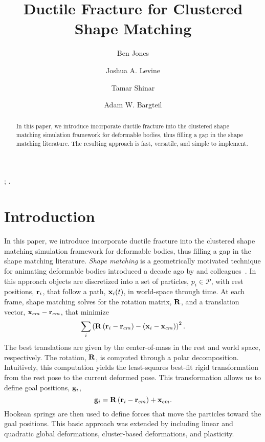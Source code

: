 \documentclass[review]{acmsiggraph}
\title{Ductile Fracture for Clustered Shape Matching}
\author[*]{Ben Jones}
\author[**]{Joshua A. Levine}
\author[***]{Tamar Shinar}
\author[*]{Adam W. Bargteil}
\affil[*]{University of Utah}
\affil[**]{Clemson University}
\affil[***]{University of California, Riverside}
\begin{document}

 \teaser{
   \caption{}
 }

\maketitle

\begin{abstract}
In this paper, we introduce incorporate ductile fracture into the clustered shape matching simulation framework
for deformable bodies, thus filling a gap in the shape matching literature.  The resulting approach is fast,
versatile, and simple to implement.
\end{abstract}

\begin{CRcatlist}
  ;
  .
\end{CRcatlist}

\keywordlist


\copyrightspace

\section{Introduction}\label{sec:Introduction}
In this paper, we introduce incorporate ductile fracture into the clustered shape matching simulation framework
for deformable bodies, thus filling a gap in the shape matching literature. 
{\em Shape matching} is a geometrically motivated technique for animating deformable bodies introduced
a decade ago by \Mueller and colleagues~.
In this approach
objects are discretized into a set of particles, $p_i\in\mathcal{P}$, with rest positions, $\mathit{\mathbf{r}}_i$, 
that follow a path, $\mathit{\mathbf{x}}_i(t)$, in world-space through time.  
At each frame, shape matching solves for the rotation matrix, $\mathit{\mathbf{R}}$, and a translation
vector, $\mathit{\mathbf{x}}_{cm}-\mathit{\mathbf{r}}_{cm}$, that minimize
\begin{equation}
\sum_i \left(\mathit{\mathbf{R}}\left(\mathit{\mathbf{r}}_i - \mathit{\mathbf{r}}_{cm}\right)-\left(\mathit{\mathbf{x}}_i-\mathit{\mathbf{x}}_{cm}\right)\right)^2.
\end{equation}
The best translations are given by the center-of-mass in the rest and world space, respectively.  
The rotation, $\mathit{\mathbf{R}}$, is computed through a polar decomposition.  Intuitively, this computation
yields the least-squares best-fit rigid transformation from the rest pose to the current deformed pose.
This transformation allows us to define goal positions, $\mathit{\mathbf{g}}_i$,
\begin{equation}
\mathit{\mathbf{g}}_i = \mathit{\mathbf{R}}\left(\mathit{\mathbf{r}}_i-\mathit{\mathbf{r}}_{cm}\right)+\mathit{\mathbf{x}}_{cm}.
\end{equation}
Hookean springs are then used to define forces that move the particles toward the goal positions.
This basic approach was extended by including linear and quadratic global deformations, cluster-based
deformations, and plasticity.
\end{document}
